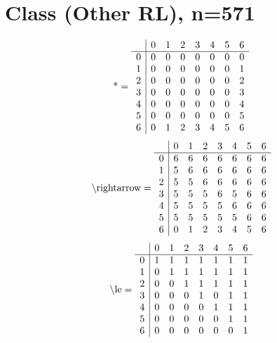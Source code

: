 \documentclass[11pt]{article}
\begin{document}
\section{Class (Other RL), n=571}
\[\text{*} = 
\begin{array}{r | r r r r r r r}
 & 0 & 1 & 2 & 3 & 4 & 5 & 6 \\ \hline
0 & 0 & 0 & 0 & 0 & 0 & 0 & 0 \\
1 & 0 & 0 & 0 & 0 & 0 & 0 & 1 \\
2 & 0 & 0 & 0 & 0 & 0 & 0 & 2 \\
3 & 0 & 0 & 0 & 0 & 0 & 0 & 3 \\
4 & 0 & 0 & 0 & 0 & 0 & 0 & 4 \\
5 & 0 & 0 & 0 & 0 & 0 & 0 & 5 \\
6 & 0 & 1 & 2 & 3 & 4 & 5 & 6 \\
\end{array}
\]
\[\text{\textbackslash rightarrow} = 
\begin{array}{r | r r r r r r r}
 & 0 & 1 & 2 & 3 & 4 & 5 & 6 \\ \hline
0 & 6 & 6 & 6 & 6 & 6 & 6 & 6 \\
1 & 5 & 6 & 6 & 6 & 6 & 6 & 6 \\
2 & 5 & 5 & 6 & 6 & 6 & 6 & 6 \\
3 & 5 & 5 & 5 & 6 & 5 & 6 & 6 \\
4 & 5 & 5 & 5 & 5 & 6 & 6 & 6 \\
5 & 5 & 5 & 5 & 5 & 5 & 6 & 6 \\
6 & 0 & 1 & 2 & 3 & 4 & 5 & 6 \\
\end{array}
\]
\[\text{\textbackslash le} = 
\begin{array}{r | r r r r r r r}
 & 0 & 1 & 2 & 3 & 4 & 5 & 6 \\ \hline
0 & 1 & 1 & 1 & 1 & 1 & 1 & 1 \\
1 & 0 & 1 & 1 & 1 & 1 & 1 & 1 \\
2 & 0 & 0 & 1 & 1 & 1 & 1 & 1 \\
3 & 0 & 0 & 0 & 1 & 0 & 1 & 1 \\
4 & 0 & 0 & 0 & 0 & 1 & 1 & 1 \\
5 & 0 & 0 & 0 & 0 & 0 & 1 & 1 \\
6 & 0 & 0 & 0 & 0 & 0 & 0 & 1 \\
\end{array}
\]
\end{document}
